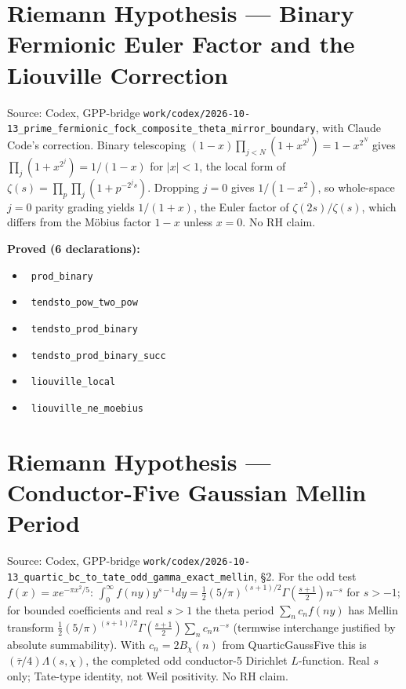 \documentclass{report}
\theoremstyle{definition}
\begin{document}
\section{Riemann Hypothesis --- Binary Fermionic Euler Factor and the Liouville Correction}
Source: Codex, GPP-bridge \texttt{work/codex/2026-10-13\_prime\_fermionic\_fock\_composite\_theta\_mirror\_boundary}, with Claude Code's correction. Binary telescoping $(1-x)\prod_{j<N}(1+x^{2^j})=1-x^{2^N}$ gives $\prod_j(1+x^{2^j})=1/(1-x)$ for $|x|<1$, the local form of $\zeta(s)=\prod_p\prod_j(1+p^{-2^js})$. Dropping $j=0$ gives $1/(1-x^2)$, so whole-space $j=0$ parity grading yields $1/(1+x)$, the Euler factor of $\zeta(2s)/\zeta(s)$, which differs from the M\"obius factor $1-x$ unless $x=0$. No RH claim.

\noindent\textbf{Proved (6 declarations):}
\begin{itemize}
  \item {}\leanok\ \texttt{prod\_binary}
  \item {}\leanok\ \texttt{tendsto\_pow\_two\_pow}
  \item {}\leanok\ \texttt{tendsto\_prod\_binary}
  \item {}\leanok\ \texttt{tendsto\_prod\_binary\_succ}
  \item {}\leanok\ \texttt{liouville\_local}
  \item {}\leanok\ \texttt{liouville\_ne\_moebius}
\end{itemize}

\section{Riemann Hypothesis --- Conductor-Five Gaussian Mellin Period}
Source: Codex, GPP-bridge \texttt{work/codex/2026-10-13\_quartic\_bc\_to\_tate\_odd\_gamma\_exact\_mellin}, \S2. For the odd test $f(x)=xe^{-\pi x^2/5}$: $\int_0^\infty f(ny)y^{s-1}dy=\tfrac12(5/\pi)^{(s+1)/2}\Gamma(\tfrac{s+1}2)n^{-s}$ for $s>-1$; for bounded coefficients and real $s>1$ the theta period $\sum_n c_nf(ny)$ has Mellin transform $\tfrac12(5/\pi)^{(s+1)/2}\Gamma(\tfrac{s+1}2)\sum_n c_nn^{-s}$ (termwise interchange justified by absolute summability). With $c_n=2B_\chi(n)$ from QuarticGaussFive this is $(\bar\tau/4)\Lambda(s,\chi)$, the completed odd conductor-5 Dirichlet $L$-function. Real $s$ only; Tate-type identity, not Weil positivity. No RH claim.
\end{document}
